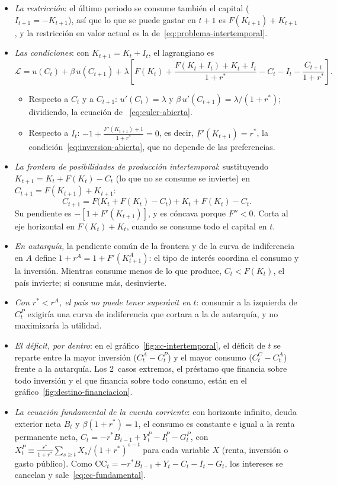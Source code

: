\documentclass[11pt]{article}
\begin{document}
\begin{itemize}
\item \emph{La restricción}: el último periodo se consume también el capital ($I_{t+1}=-K_{t+1}$), así que lo que se puede gastar en $t+1$ es $F(K_{t+1})+K_{t+1}$, y la restricción en valor actual es la de~\eqref{eq:problema-intertemporal}.
\item \emph{Las condiciones}: con $K_{t+1}=K_t+I_t$, el lagrangiano es
  \[
  \mathcal L=u(C_t)+\beta\,u(C_{t+1})+\lambda\left[F(K_t)+\frac{F(K_t+I_t)+K_t+I_t}{1+r^*}-C_t-I_t-\frac{C_{t+1}}{1+r^*}\right].
  \]
  \begin{itemize}
  \item Respecto a $C_t$ y a $C_{t+1}$: $u'(C_t)=\lambda$ y $\beta\,u'(C_{t+1})=\lambda/(1+r^*)$; dividiendo, la ecuación de ~\eqref{eq:euler-abierta}.
  \item Respecto a $I_t$: $-1+\frac{F'(K_{t+1})+1}{1+r^*}=0$, es decir, $F'(K_{t+1})=r^*$, la condición~\eqref{eq:inversion-abierta}, que no depende de las preferencias. \findemo
  \end{itemize}
\item \emph{La frontera de posibilidades de producción intertemporal}: sustituyendo $K_{t+1}=K_t+F(K_t)-C_t$ (lo que no se consume se invierte) en $C_{t+1}=F(K_{t+1})+K_{t+1}$:
  \[
  C_{t+1}=F\big(K_t+F(K_t)-C_t\big)+K_t+F(K_t)-C_t .
  \]
  Su pendiente es $-[1+F'(K_{t+1})]$, y es cóncava porque $F''<0$. Corta al eje horizontal en $F(K_t)+K_t$, cuando se consume todo el capital en $t$.
\item \emph{En autarquía}, la pendiente común de la frontera y de la curva de indiferencia en $A$ define $1+r^A=1+F'(K^A_{t+1})$: el tipo de interés coordina el consumo y la inversión. Mientras consume menos de lo que produce, $C_t<F(K_t)$, el país invierte; si consume más, desinvierte.
\item \emph{Con $r^*<r^A$, el país no puede tener superávit en $t$}: consumir a la izquierda de $C^P_t$ exigiría una curva de indiferencia que cortara a la de autarquía, y no maximizaría la utilidad.
\item \emph{El déficit, por dentro}: en el gráfico~\ref{fig:cc-intertemporal}, el déficit de $t$ se reparte entre la mayor inversión ($C^A_t-C^P_t$) y el mayor consumo ($C^C_t-C^A_t$) frente a la autarquía. Los 2~casos extremos, el préstamo que financia sobre todo inversión y el que financia sobre todo consumo, están en el gráfico~\ref{fig:destino-financiacion}.
\item \emph{La ecuación fundamental de la cuenta corriente}: con horizonte infinito, deuda exterior neta $B_t$ y $\beta(1+r^*)=1$, el consumo es constante e igual a la renta permanente neta, $C_t=-r^*B_{t-1}+Y^P_t-I^P_t-G^P_t$, con $X^P_t\equiv\frac{r^*}{1+r^*}\sum_{s\geq t}X_s/(1+r^*)^{s-t}$ para cada variable $X$ (renta, inversión o gasto público). Como $\mathrm{CC}_t=-r^*B_{t-1}+Y_t-C_t-I_t-G_t$, los intereses se cancelan y sale~\eqref{eq:cc-fundamental}\nocite{ObstfeldRogoff1996Foundations}. \findemo
\end{itemize}
\end{document}
